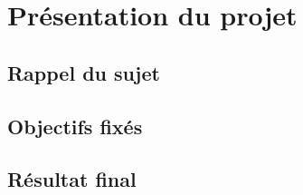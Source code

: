 \chapter{Présentation du projet}


\section{Rappel du sujet}

\section{Objectifs fixés}

\section{Résultat final}
